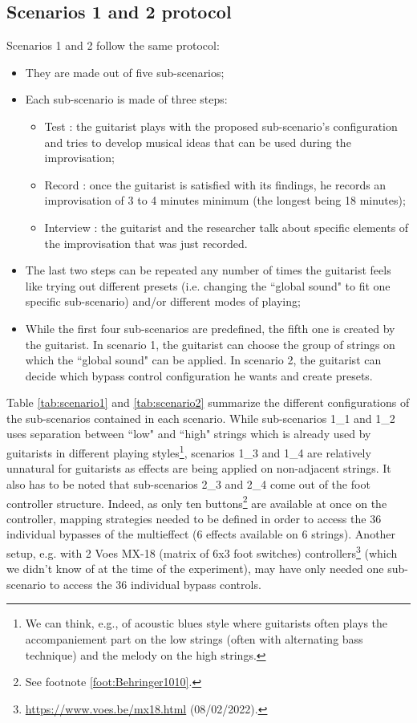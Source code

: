 \documentclass{article}
\begin{document}
\subsection{Scenarios 1 and 2 protocol}
Scenarios 1 and 2 follow the same protocol: 
\begin{itemize}
    \item They are made out of five sub-scenarios;
    \item Each sub-scenario is made of three steps: 
    \begin{itemize}
        \item Test : the guitarist plays with the proposed sub-scenario's configuration and tries to develop musical ideas that can be used during the improvisation;
        \item Record : once the guitarist is satisfied with its findings, he records an improvisation of 3 to 4 minutes minimum (the longest being 18 minutes);
        \item Interview : the guitarist and the researcher talk about specific elements of the improvisation that was just recorded.
    \end{itemize}
    \item The last two steps can be repeated any number of times the guitarist feels like trying out different presets (i.e. changing the ``global sound" to fit one specific sub-scenario) and/or different modes of playing;
    \item While the first four sub-scenarios are predefined, the fifth one is created by the guitarist. In scenario 1, the guitarist can choose the group of strings on which the ``global sound" can be applied. In scenario 2, the guitarist can decide which bypass control configuration he wants and create presets.
\end{itemize}

Table \ref{tab:scenario1} and \ref{tab:scenario2} summarize the different configurations of the sub-scenarios contained in each scenario.
While sub-scenarios 1\_1 and 1\_2 uses separation between ``low" and ``high" strings which is already used by guitarists in different playing styles\footnote{We can think, e.g., of acoustic blues style where guitarists often plays the accompaniement part on the low strings (often with alternating bass technique) and the melody on the high strings.}, scenarios 1\_3 and 1\_4 are relatively unnatural for guitarists as effects are being applied on non-adjacent strings.
It also has to be noted that sub-scenarios 2\_3 and 2\_4 come out of the foot controller structure. Indeed, as only ten buttons\footnote{See footnote \ref{foot:Behringer1010}.} are available at once on the controller, mapping strategies needed to be defined in order to access the 36 individual bypasses of the multieffect (6 effects available on 6 strings). Another setup, e.g. with 2 Voes MX-18 (matrix of 6x3 foot switches) controllers\footnote{\url{https://www.voes.be/mx18.html} (08/02/2022).} (which we didn't know of at the time of the experiment), may have only needed one sub-scenario to access the 36 individual bypass controls.
\end{document}
